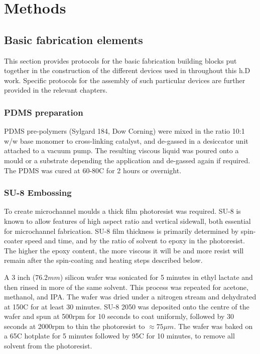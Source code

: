 \chapter{Methods}
\label{chap:methods}



	\section{Basic fabrication elements}
    This section provides protocols for the basic fabrication building blocks put together in the construction of the different devices used in throughout this h.D work. Specific protocols for the assembly of such particular devices are further provided in the relevant chapters.

    \label{sec:methods:fabrication}
        \subsection{PDMS preparation}
        PDMS pre-polymers (Sylgard 184, Dow Corning) were mixed in the ratio 10:1 w/w base monomer to cross-linking catalyst, and de-gassed in a desiccator unit attached to a vacuum pump. The resulting viscous liquid was poured onto a mould or a substrate depending the application and de-gassed again if required. The PDMS was cured at 60-80\degree C for 2 hours or overnight.
        \label{sec:methods:PDMSMix}


        \subsection{SU-8 Embossing}
        To create microchannel moulds a thick film photoresist was required. SU-8 is known to allow features of high aspect ratio and vertical sidewall, both essential for microchannel fabrication. SU-8 film thickness is primarily determined by spin-coater speed and time, and by the ratio of solvent to epoxy in the photoresist. The higher the epoxy content, the more viscous it will be and more resist will remain after the spin-coating and heating steps described below.

        A 3 inch (\(76.2mm\)) silicon wafer was sonicated for 5 minutes in ethyl lactate and then rinsed in more of the same solvent. This process was repeated for acetone, methanol, and IPA. The wafer was dried under a nitrogen stream and dehydrated at 150\degree C for at least 30 minutes. SU-8 2050 was deposited onto the centre of the wafer and spun at 500rpm for 10 seconds to coat uniformly, followed by 30 seconds at 2000rpm to thin the photoresist to \(\approx 75\mu m\). The wafer was baked on a 65\degree C hotplate for 5 minutes followed by 95\degree C for 10 minutes, to remove all solvent from the photoresist.


